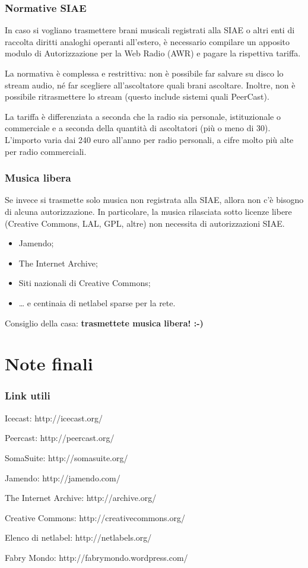 \documentclass{beamer}
\begin{document}
\begin{frame}\frametitle{Normative SIAE}
In caso si vogliano trasmettere brani musicali registrati alla SIAE o
altri enti di raccolta diritti analoghi operanti all'estero, è
necessario compilare un apposito modulo di Autorizzazione per la Web
Radio (AWR) e pagare la rispettiva tariffa.

La normativa è complessa e restrittiva: non è possibile far salvare su
disco lo stream audio, né far scegliere all'ascoltatore quali brani
ascoltare. Inoltre, non è possibile ritrasmettere lo stream (questo
include sistemi quali PeerCast).

La tariffa è differenziata a seconda che la radio sia personale,
istituzionale o commerciale e a seconda della quantità di ascoltatori
(più o meno di 30). L'importo varia dai 240 euro all’anno per radio
personali, a cifre molto più alte per radio commerciali.
\end{frame}

\begin{frame}\frametitle{Musica libera}
Se invece si trasmette solo musica non registrata alla SIAE, allora
non c'è bisogno di alcuna autorizzazione. In particolare, la musica
rilasciata sotto licenze libere (Creative Commons, LAL, GPL, altre)
non necessita di autorizzazioni SIAE.

\begin{itemize}
\item Jamendo;
\item The Internet Archive;
\item Siti nazionali di Creative Commons;
\item {\ldots} e centinaia di netlabel sparse per la rete.
\end{itemize}

Consiglio della casa: \bf{trasmettete musica libera! :-)}
\end{frame}

\section{Note finali}

\begin{frame}\frametitle{Link utili}
Icecast: http://icecast.org/

Peercast: http://peercast.org/

SomaSuite: http://somasuite.org/

Jamendo: http://jamendo.com/

The Internet Archive: http://archive.org/

Creative Commons: http://creativecommons.org/

Elenco di netlabel: http://netlabels.org/

Fabry Mondo: http://fabrymondo.wordpress.com/
\end{frame}
\end{document}
